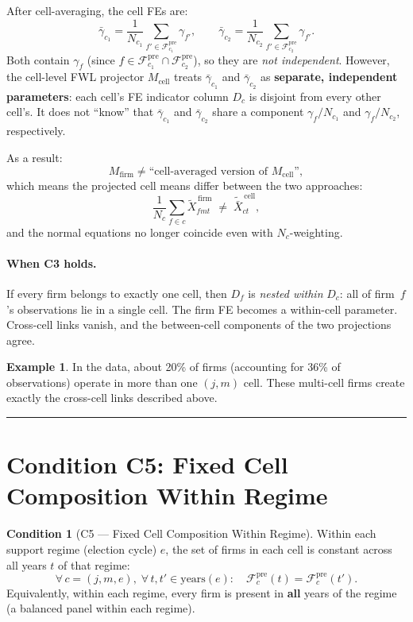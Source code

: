 \documentclass{article}
\newcommand{\cFpre}{\mathcal{F}^{\mathrm{pre}}}
\theoremstyle{plain}
\theoremstyle{definition}
\newtheorem{condition}{Condition}
\newtheorem{example}{Example}
\begin{document}
After cell-averaging, the cell FEs are:
\[
  \bar\gamma_{c_1}
  = \frac{1}{N_{c_1}}\sum_{f' \in \cFpre_{c_1}} \gamma_{f'},
  \qquad
  \bar\gamma_{c_2}
  = \frac{1}{N_{c_2}}\sum_{f' \in \cFpre_{c_2}} \gamma_{f'}.
\]
Both contain $\gamma_f$ (since $f \in \cFpre_{c_1} \cap \cFpre_{c_2}$), so
they are \emph{not independent}.  However, the cell-level FWL projector
$M_\mathrm{cell}$ treats $\bar\gamma_{c_1}$ and $\bar\gamma_{c_2}$ as
\textbf{separate, independent parameters}: each cell's FE indicator column
$D_c$ is disjoint from every other cell's.  It does not ``know'' that
$\bar\gamma_{c_1}$ and $\bar\gamma_{c_2}$ share a component
$\gamma_f / N_{c_1}$ and $\gamma_f / N_{c_2}$, respectively.

As a result:
\[
  M_\mathrm{firm} \neq \text{``cell-averaged version of } M_\mathrm{cell}\text{''},
\]
which means the projected cell means differ between the two approaches:
\[
  \frac{1}{N_c}\sum_{f \in c} \widetilde{X}^{\,\mathrm{firm}}_{fmt}
  \;\neq\;
  \widetilde{\bar{X}}^{\,\mathrm{cell}}_{ct},
\]
and the normal equations no longer coincide even with $N_c$-weighting.

\paragraph{When C3 holds.}
If every firm belongs to exactly one cell, then $D_f$ is \emph{nested within}
$D_c$: all of firm~$f$'s observations lie in a single cell.  The firm FE
becomes a within-cell parameter.  Cross-cell links vanish, and the between-cell
components of the two projections agree.

\begin{example}
In the data, about 20\% of firms (accounting for 36\% of observations) operate
in more than one $(j, m)$ cell.  These multi-cell firms create exactly the
cross-cell links described above.
\end{example}

\bigskip
\hrule
\bigskip

\section{Condition C5: Fixed Cell Composition Within Regime}

\begin{condition}[C5 --- Fixed Cell Composition Within Regime]
Within each support regime (election cycle) $e$, the set of firms in each cell
is constant across all years $t$ of that regime:
\[
  \forall\, c = (j, m, e),\;\forall\, t, t' \in \text{years}(e):\quad
  \cFpre_c(t) = \cFpre_c(t').
\]
Equivalently, within each regime, every firm is present in \textbf{all} years of
the regime (a balanced panel within each regime).
\end{condition}
\end{document}
